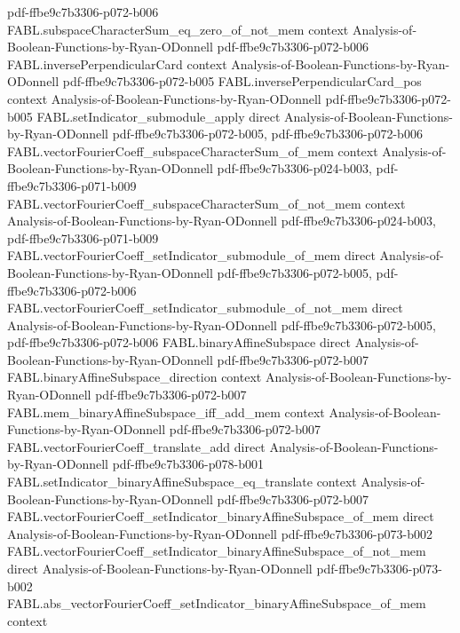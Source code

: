 \begin{theorem}
  {pdf-ffbe9c7b3306-p072-b006}
\proofstep
  {FABL.subspaceCharacterSum_eq_zero_of_not_mem}
  {context}
  {Analysis-of-Boolean-Functions-by-Ryan-ODonnell}
  {pdf-ffbe9c7b3306-p072-b006}
\proofstep
  {FABL.inversePerpendicularCard}
  {context}
  {Analysis-of-Boolean-Functions-by-Ryan-ODonnell}
  {pdf-ffbe9c7b3306-p072-b005}
\proofstep
  {FABL.inversePerpendicularCard_pos}
  {context}
  {Analysis-of-Boolean-Functions-by-Ryan-ODonnell}
  {pdf-ffbe9c7b3306-p072-b005}
\proofstep
  {FABL.setIndicator_submodule_apply}
  {direct}
  {Analysis-of-Boolean-Functions-by-Ryan-ODonnell}
  {pdf-ffbe9c7b3306-p072-b005,
    pdf-ffbe9c7b3306-p072-b006}
\proofstep
  {FABL.vectorFourierCoeff_subspaceCharacterSum_of_mem}
  {context}
  {Analysis-of-Boolean-Functions-by-Ryan-ODonnell}
  {pdf-ffbe9c7b3306-p024-b003,
    pdf-ffbe9c7b3306-p071-b009}
\proofstep
  {FABL.vectorFourierCoeff_subspaceCharacterSum_of_not_mem}
  {context}
  {Analysis-of-Boolean-Functions-by-Ryan-ODonnell}
  {pdf-ffbe9c7b3306-p024-b003,
    pdf-ffbe9c7b3306-p071-b009}
\proofstep
  {FABL.vectorFourierCoeff_setIndicator_submodule_of_mem}
  {direct}
  {Analysis-of-Boolean-Functions-by-Ryan-ODonnell}
  {pdf-ffbe9c7b3306-p072-b005,
    pdf-ffbe9c7b3306-p072-b006}
\proofstep
  {FABL.vectorFourierCoeff_setIndicator_submodule_of_not_mem}
  {direct}
  {Analysis-of-Boolean-Functions-by-Ryan-ODonnell}
  {pdf-ffbe9c7b3306-p072-b005,
    pdf-ffbe9c7b3306-p072-b006}
\proofstep
  {FABL.binaryAffineSubspace}
  {direct}
  {Analysis-of-Boolean-Functions-by-Ryan-ODonnell}
  {pdf-ffbe9c7b3306-p072-b007}
\proofstep
  {FABL.binaryAffineSubspace_direction}
  {context}
  {Analysis-of-Boolean-Functions-by-Ryan-ODonnell}
  {pdf-ffbe9c7b3306-p072-b007}
\proofstep
  {FABL.mem_binaryAffineSubspace_iff_add_mem}
  {context}
  {Analysis-of-Boolean-Functions-by-Ryan-ODonnell}
  {pdf-ffbe9c7b3306-p072-b007}
\proofstep
  {FABL.vectorFourierCoeff_translate_add}
  {direct}
  {Analysis-of-Boolean-Functions-by-Ryan-ODonnell}
  {pdf-ffbe9c7b3306-p078-b001}
\proofstep
  {FABL.setIndicator_binaryAffineSubspace_eq_translate}
  {context}
  {Analysis-of-Boolean-Functions-by-Ryan-ODonnell}
  {pdf-ffbe9c7b3306-p072-b007}
\proofstep
  {FABL.vectorFourierCoeff_setIndicator_binaryAffineSubspace_of_mem}
  {direct}
  {Analysis-of-Boolean-Functions-by-Ryan-ODonnell}
  {pdf-ffbe9c7b3306-p073-b002}
\proofstep
  {FABL.vectorFourierCoeff_setIndicator_binaryAffineSubspace_of_not_mem}
  {direct}
  {Analysis-of-Boolean-Functions-by-Ryan-ODonnell}
  {pdf-ffbe9c7b3306-p073-b002}
\proofstep
  {FABL.abs_vectorFourierCoeff_setIndicator_binaryAffineSubspace_of_mem}
  {context}

\end{theorem}
